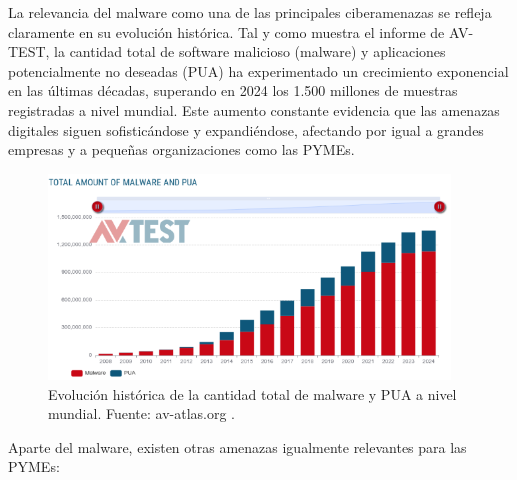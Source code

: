 \documentclass[a4paper, 10pt]{article}
\begin{document}
\vspace{0.5cm}

La relevancia del malware como una de las principales ciberamenazas se refleja claramente en su evolución histórica. Tal y como muestra el informe de AV-TEST, la cantidad total de software malicioso (malware) y aplicaciones potencialmente no deseadas (PUA) ha experimentado un crecimiento exponencial en las últimas décadas, superando en 2024 los 1.500 millones de muestras registradas a nivel mundial. Este aumento constante evidencia que las amenazas digitales siguen sofisticándose y expandiéndose, afectando por igual a grandes empresas y a pequeñas organizaciones como las PYMEs.

\vspace{0.3cm}

\begin{figure}[H]
    \centering
    \includegraphics[width=0.95\textwidth]{images/malware.png}
    \caption{Evolución histórica de la cantidad total de malware y PUA a nivel mundial. Fuente: av-atlas.org \cite{avtest}.}
\end{figure}

\vspace{0.5cm}

Aparte del malware, existen otras amenazas igualmente relevantes para las PYMEs:
\end{document}
